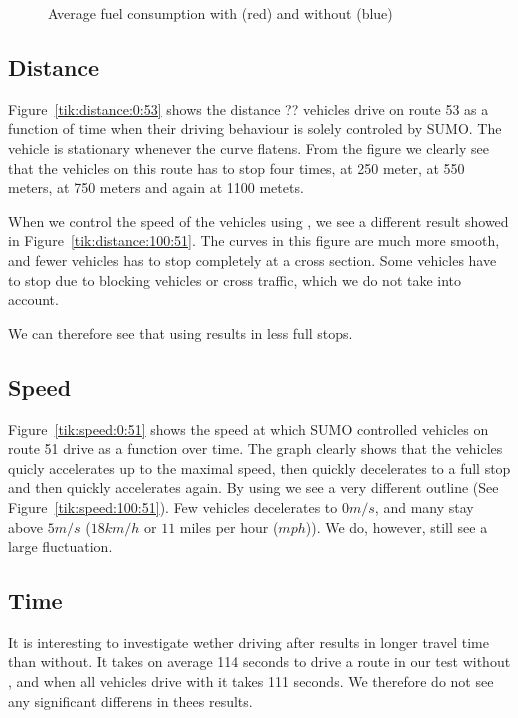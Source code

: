 %
%

\begin{figure}
\caption{Average fuel consumption with (red) and without \tech (blue)}\label{tik:fuel:avg}
\end{figure}


\subsection{Distance}
Figure~\ref{tik:distance:0:53} shows the distance ?? vehicles drive on route 53 as a function of time when their driving behaviour is solely controled by SUMO. 
The vehicle is stationary whenever the curve flatens.
From the figure we clearly see that the vehicles on this route has to stop four times, at 250 meter, at 550 meters, at 750 meters and again at 1100 metets.

When we control the speed of the vehicles using \tech, we see a different result showed in Figure~\ref{tik:distance:100:51}.
The curves in this figure are much more smooth, and fewer vehicles has to stop completely at a cross section.
Some vehicles have to stop due to blocking vehicles or cross traffic, which we do not take into account.

We can therefore see that using \tech results in less full stops.



\subsection{Speed}
Figure~\ref{tik:speed:0:51} shows the speed at which SUMO controlled vehicles on route 51 drive as a function over time.
The graph clearly shows that the vehicles quicly accelerates up to the maximal speed, then quickly decelerates to a full stop and then quickly accelerates again.
By using \tech we see a very different outline (See Figure~\ref{tik:speed:100:51}).
Few vehicles decelerates to $0 m/s$, and many stay above $5 m/s$ ($18 km/h$ or $11$ miles per hour ($mph$)).
We do, however, still see a large fluctuation.



\subsection{Time}
It is interesting to investigate wether driving after \tech results in longer travel time than without.
It takes on average 114 seconds to drive a route in our test without \tech, and when all vehicles drive with \tech it takes 111 seconds. 
We therefore do not see any significant differens in thees results.


